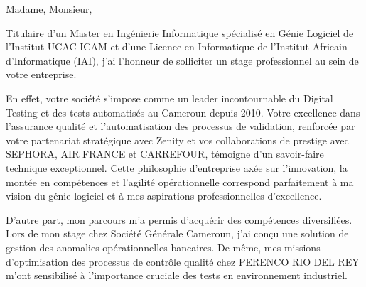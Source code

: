 \documentclass[11pt, a4paper]{awesome-cv}
\begin{document}
\makecvheader[L]


\makelettertitle

\begin{cvletter}



Madame, Monsieur,

\setlength{\parindent}{2em}  %

\indent Titulaire d'un Master en Ingénierie Informatique spécialisé en Génie Logiciel de l'Institut UCAC-ICAM et d'une Licence en Informatique de l'Institut Africain d'Informatique (IAI), j'ai l'honneur de solliciter un stage professionnel au sein de votre entreprise.

\indent En effet, votre société s'impose comme un leader incontournable du Digital Testing et des tests automatisés au Cameroun depuis 2010. Votre excellence dans l'assurance qualité et l'automatisation des processus de validation, renforcée par votre partenariat stratégique avec Zenity et vos collaborations de prestige avec SEPHORA, AIR FRANCE et CARREFOUR, témoigne d'un savoir-faire technique exceptionnel. Cette philosophie d'entreprise axée sur l'innovation, la montée en compétences et l'agilité opérationnelle correspond parfaitement à ma vision du génie logiciel et à mes aspirations professionnelles d'excellence.


\indent D'autre part, mon parcours m'a permis d'acquérir des compétences diversifiées. Lors de mon stage chez Société Générale Cameroun, j'ai conçu une solution de gestion des anomalies opérationnelles bancaires. De même, mes missions d'optimisation des processus de contrôle qualité chez PERENCO RIO DEL REY m'ont sensibilisé à l'importance cruciale des tests en environnement industriel.


\end{cvletter}
\end{document}
